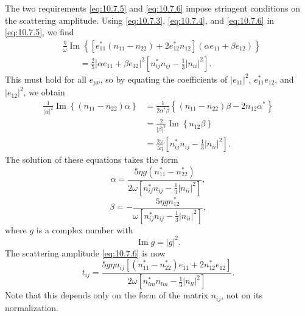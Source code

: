 The two requirements \eqref{eq:10.7.5} and \eqref{eq:10.7.6} impose
stringent conditions on the scattering amplitude. Using
\eqref{eq:10.7.3}, \eqref{eq:10.7.4}, and \eqref{eq:10.7.6} in
\eqref{eq:10.7.5}, we find
\[
  \begin{split}
  &\frac{\eta}{\omega}
  \operatorname{Im}\!\left\{
    \left[
      e_{11}^*(n_{11}-n_{22})+2e_{12}^*n_{12}
    \right]
    (\alpha e_{11}+\beta e_{12})
  \right\}
  \\
  &\qquad
  =
  \frac25
  \lvert\alpha e_{11}+\beta e_{12}\rvert^2
  \left[
    n_{ij}^*n_{ij}-\frac13\lvert n_{ii}\rvert^2
  \right].
  \end{split}
\]
This must hold for all \(e_{\mu\nu}\), so by equating the coefficients of
\(\lvert e_{11}\rvert^2\), \(e_{11}^*e_{12}\), and
\(\lvert e_{12}\rvert^2\), we obtain
\[
  \begin{split}
  \frac{1}{\lvert\alpha\rvert^2}
  \operatorname{Im}\!\left\{(n_{11}-n_{22})\alpha\right\}
  &=
  \frac{1}{2\alpha^*\beta}
  \left\{
    (n_{11}-n_{22})\beta-2n_{12}\alpha^*
  \right\}
  \\
  &=
  \frac{2}{\lvert\beta\rvert^2}
  \operatorname{Im}\!\left\{n_{12}\beta\right\}
  \\
  &=
  \frac{2\omega}{5\eta}
  \left[
    n_{ij}^*n_{ij}-\frac13\lvert n_{ii}\rvert^2
  \right].
  \end{split}
\]
The solution of these equations takes the form
\[
  \alpha
  =
  \frac{
    5\eta g(n_{11}^*-n_{22}^*)
  }{
    2\omega\left[
      n_{ij}^*n_{ij}-\frac13\lvert n_{ii}\rvert^2
    \right]
  },
\]
\[
  \beta
  =
  -\frac{
    5\eta g n_{12}^*
  }{
    \omega\left[
      n_{ij}^*n_{ij}-\frac13\lvert n_{ii}\rvert^2
    \right]
  },
\]
where \(g\) is a complex number with
\begin{equation}
  \operatorname{Im}g=\lvert g\rvert^2.
  \tag{10.7.8}\label{eq:10.7.8}
\end{equation}
The scattering amplitude \eqref{eq:10.7.6} is now
\begin{equation}
  t_{ij}
  =
  \frac{
    5g\eta n_{ij}
    \left[
      (n_{11}^*-n_{22}^*)e_{11}+2n_{12}^*e_{12}
    \right]
  }{
    2\omega\left[
      n_{lm}^*n_{lm}-\frac13\lvert n_{ll}\rvert^2
    \right]
  }.
  \tag{10.7.9}\label{eq:10.7.9}
\end{equation}
Note that this depends only on the form of the matrix \(n_{ij}\), not on its
normalization.

